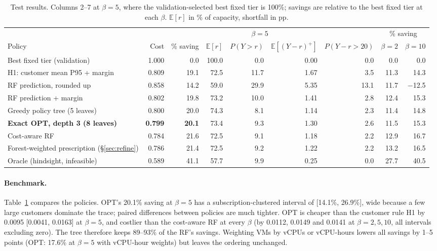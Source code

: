 \documentclass[10pt]{article}
\newcommand{\Ex}{\mathbb{E}}
\begin{document}
\begin{table}[t]
\centering\small
\caption{Test results. Columns 2--7 at $\beta=5$, where the validation-selected best fixed tier is 100\%; savings are relative to the best fixed tier at each $\beta$. $\Ex[r]$ in \% of capacity, shortfall in pp.}
\label{tab:main}
\setlength{\tabcolsep}{4pt}
\begin{tabular}{lrrrrrr|rr}
\toprule
 & \multicolumn{6}{c|}{$\beta=5$} & \multicolumn{2}{c}{\% saving} \\
Policy & Cost & \% saving & $\Ex[r]$ & $P(Y{>}r)$ & $\Ex[(Y{-}r)^+]$ & $P(Y{-}r{>}20)$ & $\beta{=}2$ & $\beta{=}10$ \\
\midrule
Best fixed tier (validation) & 1.000 & 0.0 & 100.0 & 0.0 & 0.00 & 0.0 & 0.0 & 0.0 \\
H1: customer mean P95 + margin & 0.809 & 19.1 & 72.5 & 11.7 & 1.67 & 3.5 & 11.3 & 14.3 \\
RF prediction, rounded up & 0.858 & 14.2 & 59.0 & 29.9 & 5.35 & 13.1 & 11.7 & $-$12.5 \\
RF prediction + margin & 0.802 & 19.8 & 73.2 & 10.0 & 1.41 & 2.8 & 12.4 & 15.3 \\
Greedy policy tree (5 leaves) & 0.800 & 20.0 & 74.3 & 8.1 & 1.14 & 2.3 & 11.4 & 14.8 \\
\textbf{Exact OPT, depth 3 (8 leaves)} & \textbf{0.799} & \textbf{20.1} & 73.4 & 9.3 & 1.30 & 2.6 & 11.5 & 15.3 \\
Cost-aware RF & 0.784 & 21.6 & 72.5 & 9.1 & 1.18 & 2.2 & 12.9 & 16.7 \\
Forest-weighted prescription (\S\ref{sec:refine}) & 0.786 & 21.4 & 72.5 & 9.2 & 1.22 & 2.2 & 13.2 & 16.5 \\
\midrule
Oracle (hindsight, infeasible) & 0.589 & 41.1 & 57.7 & 9.9 & 0.25 & 0.0 & 27.7 & 40.5 \\
\bottomrule
\end{tabular}
\end{table}

\paragraph{Benchmark.} Table~\ref{tab:main} compares the policies. OPT's 20.1\% saving at $\beta=5$ has a subscription-clustered interval of [14.1\%, 26.9\%], wide because a few large customers dominate the trace; paired differences between policies are much tighter. OPT is cheaper than the customer rule H1 by 0.0095 [0.0041, 0.0163] at $\beta=5$, and costlier than the cost-aware RF at every $\beta$ (by 0.0112, 0.0149 and 0.0141 at $\beta=2,5,10$, all intervals excluding zero). The tree therefore keeps 89--93\% of the RF's savings. Weighting VMs by vCPUs or vCPU-hours lowers all savings by 1--5 points (OPT: 17.6\% at $\beta=5$ with vCPU-hour weights) but leaves the ordering unchanged.
\end{document}
